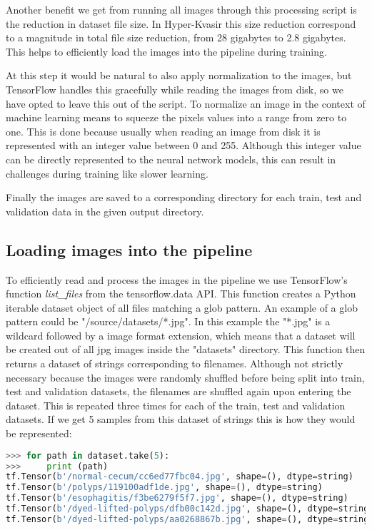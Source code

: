 \documentclass[thesis.tex]{subfiles}
\begin{document}
Another benefit we get from running all images through this processing script is the reduction in dataset file size. In Hyper-Kvasir this size reduction correspond to a magnitude in total file size reduction, from 28 gigabytes to 2.8 gigabytes. This helps to efficiently load the images into the pipeline during training.

At this step it would be natural to also apply normalization to the images, but TensorFlow handles this gracefully while reading the images from disk, so we have opted to leave this out of the script. To normalize an image in the context of machine learning means to squeeze the pixels values into a range from zero to one. This is done because usually when reading an image from disk it is represented with an integer value between 0 and 255. Although this integer value can be directly represented to the neural network models, this can result in challenges during training like slower learning.

Finally the images are saved to a corresponding directory for each train, test and validation data in the given output directory.



\subsection{Loading images into the pipeline}
To efficiently read and process the images in the pipeline we use TensorFlow's function \textit{list\_files} from the tensorflow.data API. This function creates a Python iterable dataset object of all files matching a glob pattern. An example of a glob pattern could be "/source/datasets/*.jpg". In this example the "*.jpg" is a wildcard followed by a image format extension, which means that a dataset will be created out of all jpg images inside the "datasets" directory. This function then returns a dataset of strings corresponding to filenames. Although not strictly necessary because the images were randomly shuffled before being split into train, test and validation datasets, the filenames are shuffled again upon entering the dataset. This is repeated three times for each of the train, test and validation datasets. If we get 5 samples from this dataset of strings this is how they would be represented:

\begin{lstlisting}[language=Python]
>>> for path in dataset.take(5):
>>> 	print (path)
tf.Tensor(b'/normal-cecum/cc6ed77fbc04.jpg', shape=(), dtype=string)
tf.Tensor(b'/polyps/119100adf1de.jpg', shape=(), dtype=string)
tf.Tensor(b'/esophagitis/f3be6279f5f7.jpg', shape=(), dtype=string)
tf.Tensor(b'/dyed-lifted-polyps/dfb00c142d.jpg', shape=(), dtype=string)
tf.Tensor(b'/dyed-lifted-polyps/aa0268867b.jpg', shape=(), dtype=string)
\end{lstlisting}
\end{document}
